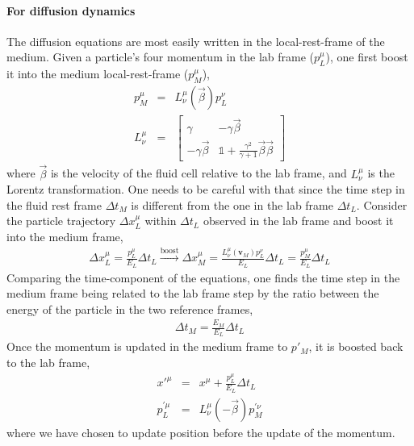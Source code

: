 \paragraph{For diffusion dynamics} The diffusion equations are most easily written in the local-rest-frame of the medium.
Given a particle's four momentum in the lab frame ($p_{L}^\mu$), one first boost it into the medium local-rest-frame ($p_{M}^\mu$),
\begin{eqnarray}
p_{M}^\mu &=& L^\mu_\nu(\vec{\beta}) p_{L}^\nu\\
L^\mu_\nu &=& 
\begin{bmatrix}
\gamma & -\gamma\vec{\beta}\\
-\gamma\vec{\beta} & \mathbb{1} + \frac{\gamma^2}{\gamma+1}\vec{\beta}\vec{\beta}
\end{bmatrix}
\end{eqnarray}
where $\vec{\beta}$ is the velocity of the fluid cell relative to the lab frame, and $L^\mu_\nu$ is the Lorentz transformation.
One needs to be careful with that since the time step in the fluid rest frame $\Delta t_{M}$ is different from the one in the lab frame $\Delta t_{L}$.
Consider the particle trajectory $\Delta x_{L}^\mu$ within $\Delta t_{L}$ observed in the lab frame and boost it into the medium frame,
\begin{eqnarray}
\Delta x_{L}^\mu = \frac{p_{L}^\mu}{E_L} \Delta t_{L} \xrightarrow{\textrm{boost}} \Delta x_{M}^\mu = \frac{L^\mu_\nu(\mathbf{v}_{M}) p_{L}^\nu}{E_L} \Delta t_L = \frac{p_{M}^\mu}{E_L} \Delta t_L
\end{eqnarray}
Comparing the time-component of the equations, one finds the time step in the medium frame being related to the lab frame step by the ratio between the energy of the particle in the two reference frames,
\begin{eqnarray}
\Delta t_M = \frac{E_M}{E_L} \Delta t_L
\end{eqnarray}
Once the momentum is updated in the medium frame to $p'_M$, it is boosted back to the lab frame,
\begin{eqnarray}
x'^{\mu} &=& x^{\mu} + \frac{p_{L}^\mu}{E_L} \Delta t_{L} \\
p_{L}^{'\mu} &=& L^\mu_\nu(-\vec{\beta}) p_{M}^{'\nu}
\end{eqnarray}
where we have chosen to update position before the update of the momentum.

